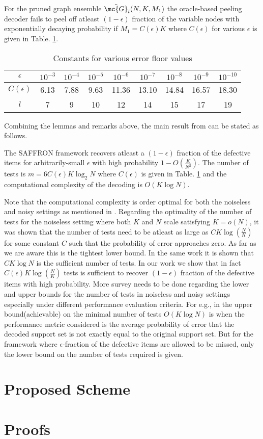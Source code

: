 \documentclass[conference,twocolumn]{IEEEtran}
\begin{document}
\begin{lemma}
For the pruned graph ensemble $\tilde{\mc{G}}_l(N, K,M_1)$ the oracle-based peeling decoder fails to peel off atleast $(1-\epsilon)$ fraction of the variable nodes with exponentially decaying probability if $M_1=C(\epsilon)K$ where $C(\epsilon)$ for various $\epsilon$ is given in Table. \ref{Table:constantsDE}.
\end{lemma}

\begin{table}[h]
\centering
\label{Table:constantsDE}
\begin{tabular}{| c | c | c | c | c | c | c | c | c | }
\hline
$\epsilon$ & $10^{-3}$ & $10^{-4}$ & $10^{-5}$ & $10^{-6}$ &$ 10^{-7}$ & $10^{-8}$ & $10^{-9}$ & $10^{-10}$ \\ \hline
$C(\epsilon)$ & 6.13 & 7.88 & 9.63 & 11.36 & 13.10 & 14.84 & 16.57 & 18.30 \\ \hline
 $l$ & 7 & 9 & 10 & 12 & 14 & 15 & 17 & 19 \\ \hline
\end{tabular}
\vspace{1ex}
\caption{Constants for various error floor values}
\end{table}
Combining the lemmas and remarks above, the main result from \cite{lee2015saffron} can be stated as follows.
\begin{theorem}
The SAFFRON framework recovers atleast a $(1-\epsilon)$ fraction of the defective items for arbitrarily-small $\epsilon$ with high probability $1-O(\frac{K}{N^2})$. The number of tests is $m=6C(\epsilon)K \log_{2}N$ where $C(\epsilon)$ is given in Table. \ref{Table:constantsDE} and the computational complexity of the decoding is $O(K\log N)$.
\end{theorem}
Note that the computational complexity is order optimal for both the noiseless and noisy settings as mentioned in \cite{lee2015saffron}. Regarding the optimality of the number of tests for the noiseless setting where both $K$ and $N$ scale satisfying $K=o(N)$, it was shown \cite{atia2012boolean} that the number of tests need to be atleast as large as $C K \log (\frac{N}{K})$ for some constant $C$ such that the probability of error approaches zero. As far as we are aware this is the tightest lower bound. In the same work it is shown that $C K \log N$ is the sufficient number of tests. In our work we show that in fact $C(\epsilon) K \log(\frac{N}{K})$ tests is sufficient to recover $(1-\epsilon)$ fraction of the defective items with high probability. More survey needs to be done regarding the lower and upper bounds for the number of tests in noiseless and noisy settings especially under different performance evaluation criteria. For e.g., in \cite{atia2012boolean} the upper bound(achievable) on the minimal number of tests $O(K \log N)$ is when the performance metric considered is the average probability of error that the decoded support set is not exactly equal to the original support set. But for the framework where $\epsilon$-fraction of the defective items are allowed to be missed, only the lower bound on the number of tests required is given. 

\section{Proposed Scheme}

\section{Proofs}


\end{document}
